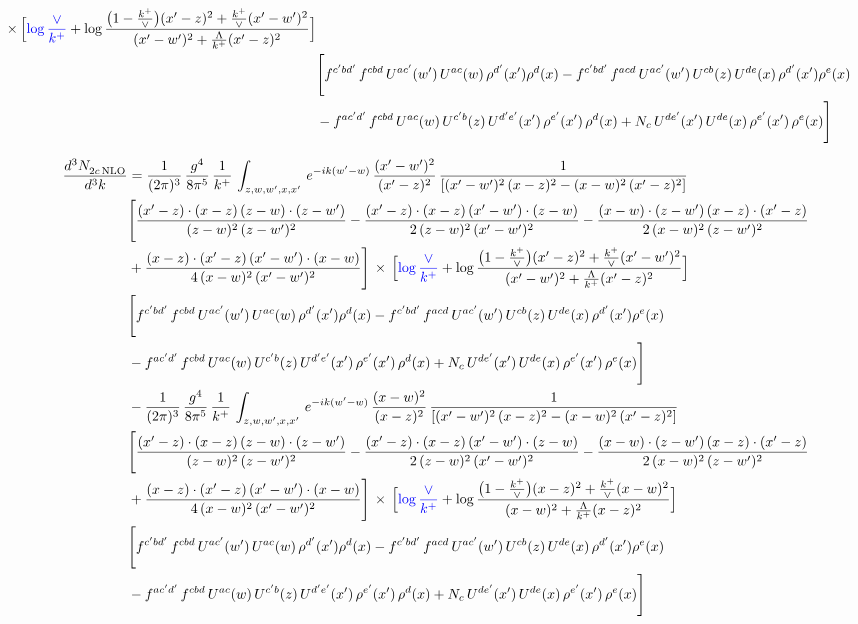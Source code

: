 \documentclass[9pt]{article}
\numberwithin{equation}{section}
\begin{document}
\begin{align}
\times\,\Big[{\color{blue}\log\frac{\vee}{k^{+}}}+\log\frac{\big(1-\frac{k^{+}}{\vee}\big)(x'-z)^{2}+\frac{k^{+}}{\vee}(x'-w')^{2}}{(x'-w')^{2}+\frac{\Lambda}{k^{+}}(x'-z)^{2}}\Big] \notag \\ & \Bigg[f^{c'bd'}\,f^{cbd}\, U^{ac'}(w')\,U^{ac}(w)\,\rho^{d'}(x')\rho^{d}(x)- f^{c'bd'}\,f^{acd}\,U^{ac'}(w')\,U^{cb}(z)\,U^{de}(x)\,\rho^{d'}(x')\rho^{e}(x) \notag \\ & -f^{ac'd'}\,f^{cbd}\,U^{ac}(w)\,U^{c'b}(z)\,U^{d'e'}(x')\,\rho^{e'}(x')\,\rho^{d}(x) +N_{c}\,U^{de'}(x')\,U^{de}(x)\,\rho^{e'}(x')\,\rho^{e}(x)\Bigg]
\end{align}

\begin{align}
    \frac{d^{3}N_{2c\,\rm NLO}^{\rm}}{d^{3}k}  & = \frac{1}{(2\pi)^{3}}\, \frac{g^{4}}{8\pi^{5}}\,\frac{1}{k^{+}}\,\int_{z,w,w^{\prime},x,x'}\, e^{-ik(w^{\prime}-w)}\,\frac{(x'-w')^{2}}{(x'-z)^{2}}\, \frac{1}{\left[(x'-w')^{2}\, (x-z)^{2} - (x-w)^{2}\, (x'-z)^{2}\right]} \notag \\ & \Bigg[\frac{(x'-z)\cdot (x-z)\, (z-w)\cdot (z-w')}{(z-w)^{2}\, (z-w')^{2}}-\frac{(x'-z)\cdot (x-z)\, (x'-w')\cdot (z-w)}{2\, (z-w)^{2}\, (x'-w')^{2}} -\frac{(x-w)\cdot (z-w')\, (x-z)\cdot (x'-z)}{2\, (x-w)^{2}\, (z-w')^{2}}\notag \\ & +\frac{(x-z)\cdot (x'-z)\, (x'-w')\cdot (x-w)}{4\, (x-w)^{2}\, (x'-w')^{2}}\Bigg]\,\times\, \Big[{\color{blue}\log\frac{\vee}{k^{+}}}+\log\frac{\big(1-\frac{k^{+}}{\vee}\big)(x'-z)^{2}+\frac{k^{+}}{\vee}(x'-w')^{2}}{(x'-w')^{2}+\frac{\Lambda}{k^{+}}(x'-z)^{2}}\Big] \notag \\ &  \Bigg[f^{c'bd'}\,f^{cbd}\, U^{ac'}(w')\,U^{ac}(w)\,\rho^{d'}(x')\rho^{d}(x)- f^{c'bd'}\,f^{acd}\,U^{ac'}(w')\,U^{cb}(z)\,U^{de}(x)\,\rho^{d'}(x')\rho^{e}(x) \notag \\ & -f^{ac'd'}\,f^{cbd}\,U^{ac}(w)\,U^{c'b}(z)\,U^{d'e'}(x')\,\rho^{e'}(x')\,\rho^{d}(x) +N_{c}\,U^{de'}(x')\,U^{de}(x)\,\rho^{e'}(x')\,\rho^{e}(x)\Bigg]\notag \\ & -\frac{1}{(2\pi)^{3}}\, \frac{g^{4}}{8\pi^{5}}\,\frac{1}{k^{+}}\,\int_{z,w,w^{\prime},x,x'}\, e^{-ik(w^{\prime}-w)}\,\frac{(x-w)^{2}}{(x-z)^{2}}\, \frac{1}{\left[(x'-w')^{2}\, (x-z)^{2} - (x-w)^{2}\, (x'-z)^{2}\right]} \notag \\ & \Bigg[\frac{(x'-z)\cdot (x-z)\, (z-w)\cdot (z-w')}{(z-w)^{2}\, (z-w')^{2}}-\frac{(x'-z)\cdot (x-z)\, (x'-w')\cdot (z-w)}{2\, (z-w)^{2}\, (x'-w')^{2}} -\frac{(x-w)\cdot (z-w')\, (x-z)\cdot (x'-z)}{2\, (x-w)^{2}\, (z-w')^{2}}\notag \\ & +\frac{(x-z)\cdot (x'-z)\, (x'-w')\cdot (x-w)}{4\, (x-w)^{2}\, (x'-w')^{2}}\Bigg]\,\times\, \Big[{\color{blue}\log\frac{\vee}{k^{+}}}+\log\frac{\big(1-\frac{k^{+}}{\vee}\big)(x-z)^{2}+\frac{k^{+}}{\vee}(x-w)^{2}}{(x-w)^{2}+\frac{\Lambda}{k^{+}}(x-z)^{2}}\Big] \notag \\ &  \Bigg[f^{c'bd'}\,f^{cbd}\, U^{ac'}(w')\,U^{ac}(w)\,\rho^{d'}(x')\rho^{d}(x)- f^{c'bd'}\,f^{acd}\,U^{ac'}(w')\,U^{cb}(z)\,U^{de}(x)\,\rho^{d'}(x')\rho^{e}(x) \notag \\ & -f^{ac'd'}\,f^{cbd}\,U^{ac}(w)\,U^{c'b}(z)\,U^{d'e'}(x')\,\rho^{e'}(x')\,\rho^{d}(x) +N_{c}\,U^{de'}(x')\,U^{de}(x)\,\rho^{e'}(x')\,\rho^{e}(x)\Bigg]
\end{align}
\end{document}

